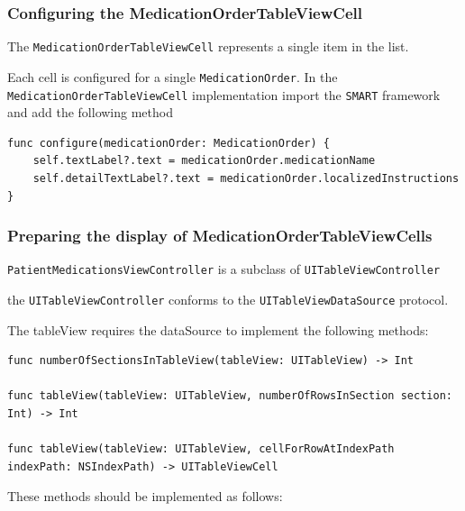 \documentclass{article}
\begin{document}
\subsubsection{Configuring the
MedicationOrderTableViewCell}\label{configuring-the-medicationordertableviewcell}

The \texttt{MedicationOrderTableViewCell} represents a single item in
the list.

Each cell is configured for a single \texttt{MedicationOrder}. In the
\texttt{MedicationOrderTableViewCell} implementation import the
\texttt{SMART} framework and add the following method

\begin{verbatim}
func configure(medicationOrder: MedicationOrder) {
    self.textLabel?.text = medicationOrder.medicationName
    self.detailTextLabel?.text = medicationOrder.localizedInstructions
}
\end{verbatim}

\subsubsection{Preparing the display of
MedicationOrderTableViewCells}\label{preparing-the-display-of-medicationordertableviewcells}

\texttt{PatientMedicationsViewController} is a subclass of
\texttt{UITableViewController}

the \texttt{UITableViewController} conforms to the
\texttt{UITableViewDataSource} protocol.

The tableView requires the dataSource to implement the following
methods:

\begin{verbatim}
func numberOfSectionsInTableView(tableView: UITableView) -> Int

func tableView(tableView: UITableView, numberOfRowsInSection section: Int) -> Int

func tableView(tableView: UITableView, cellForRowAtIndexPath indexPath: NSIndexPath) -> UITableViewCell
\end{verbatim}

These methods should be implemented as follows:
\end{document}

